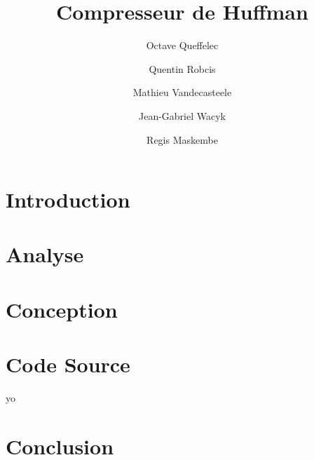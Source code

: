\documentclass{article}
\title{Compresseur de Huffman}
\author{Octave Queffelec \and Quentin Robcis \and Mathieu Vandecasteele \and Jean-Gabriel Wacyk \and Regis Maskembe}
\begin{document}
\maketitle
\newpage


\tableofcontents
\newpage


\section{Introduction}


\newpage
\section{Analyse}


\newpage
\section{Conception}



\newpage
\section{Code Source}
yo

\newpage
\section{Conclusion}

\end{document}
